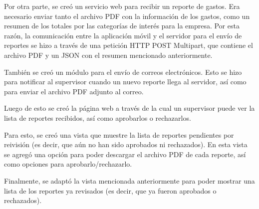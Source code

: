 Por otra parte, se creó un servicio web para recibir un reporte de gastos. Era necesario enviar tanto el archivo PDF con la información de los gastos, como un resumen de los totales por las categorías de interés para la empresa. Por esta razón, la comunicación entre la aplicación móvil y el servidor para el envío de reportes se hizo a través de una petición HTTP POST Multipart, que contiene el archivo PDF y un JSON con el resumen mencionado anteriormente.

También se creó un módulo para el envío de correos electrónicos. Esto se hizo para notificar al supervisor cuando un nuevo reporte llega al servidor, así como para enviar el archivo PDF adjunto al correo.

Luego de esto se creó la página web a través de la cual un supervisor puede ver la lista de reportes recibidos, así como aprobarlos o rechazarlos.

Para esto, se creó una vista que muestre la lista de reportes pendientes por reivisión (es decir, que aún no han sido aprobados ni rechazados). En esta vista se agregó una opción para poder descargar el archivo PDF de cada reporte, así como opciones para aprobarlo/rechazarlo.

Finalmente, se adaptó la vista mencionada anteriormente para poder mostrar una lista de los reportes ya revisados (es decir, que ya fueron aprobados o rechazados).
